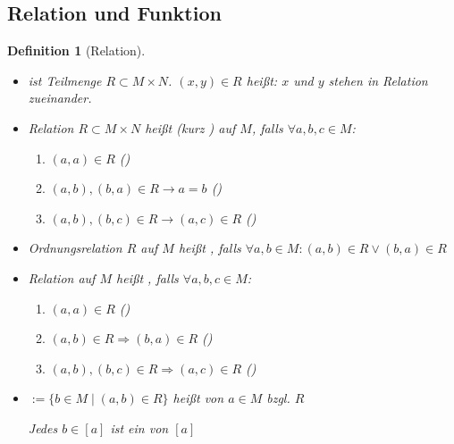 \documentclass[ngerman,a4paper]{report}
\theoremstyle{break}
\newtheorem*{definition}{Definition}
\begin{document}
\subsection*{Relation und Funktion}
\begin{definition}[Relation]
	\begin{itemize}
		\item {} ist Teilmenge $R\subset M\times N$. $(x,y)\in R$ heißt: $x$ und $y$ stehen in Relation zueinander.
		\item Relation $R\subset M\times N$ heißt  (kurz ) auf $M$, falls $\forall a,b,c\in M$:
		\begin{enumerate}[label={\alph*)}]
			\item $(a,a)\in R$ ()
			\item $(a,b),(b,a)\in R \rightarrow a=b$ ()
			\item $(a,b),(b,c)\in R \rightarrow (a,c)\in R$ ()
		\end{enumerate}
		\item Ordnungsrelation $R$ auf $M$ heißt , falls $\forall a,b\in M: (a,b)\in R \lor (b,a)\in R$
		\item Relation auf $M$ heißt , falls $\forall a,b,c\in M$:
		\begin{enumerate}[label={\alph*)}]
			\item $(a,a)\in R$ ()
			\item $(a,b)\in R \Rightarrow (b,a)\in R$ ()
			\item $(a,b),(b,c)\in R \Rightarrow (a,c)\in R$ ()
		\end{enumerate}
		\item \mathsymbol{[a]}{$[a]$}$:=\{b\in M\mid (a,b)\in R\}$ heißt  von $a\in M$ bzgl. $R$
		
		Jedes $b\in [a]$ ist ein  von $[a]$
	\end{itemize}
\end{definition}
\end{document}
